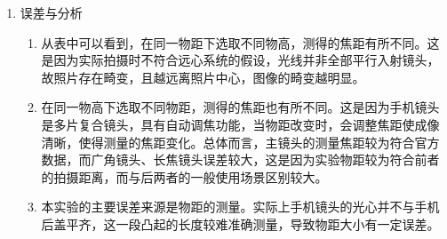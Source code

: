 \documentclass[a4paper]{article}
\begin{document}
\begin{enumerate}[label=\chinese*.,left=0pt]
\begin{enumerate}[label=\arabic*.,left=0pt]
        \item 误差与分析
        \begin{enumerate}
            \item 从表中可以看到，在同一物距下选取不同物高，测得的焦距有所不同。这是因为实际拍摄时不符合远心系统的假设，光线并非全部平行入射镜头，故照片存在畸变，且越远离照片中心，图像的畸变越明显。
            \item 在同一物高下选取不同物距，测得的焦距也有所不同。这是因为手机镜头是多片复合镜头，具有自动调焦功能，当物距改变时，会调整焦距使成像清晰，使得测量的焦距变化。总体而言，主镜头的测量焦距较为符合官方数据，而广角镜头、长焦镜头误差较大，这是因为实验物距较为符合前者的拍摄距离，而与后两者的一般使用场景区别较大。
            \item 本实验的主要误差来源是物距的测量。实际上手机镜头的光心并不与手机后盖平齐，这一段凸起的长度较难准确测量，导致物距大小有一定误差。
        \end{enumerate}
       
    \end{enumerate}
    



\end{enumerate}
\end{document}
